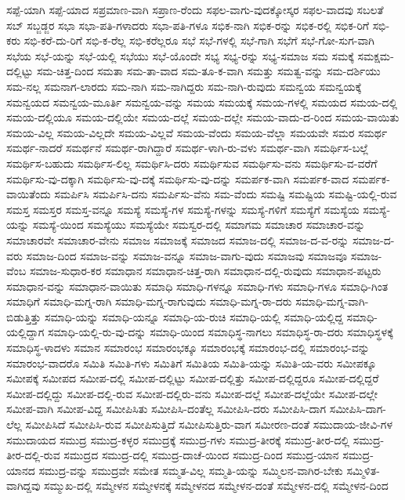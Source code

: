 {ಸಪ್ಪೆ-ಯಾಗಿ
ಸಪ್ಪೆ-ಯಾದ
ಸಪ್ರಮಾಣ-ವಾಗಿ
ಸಪ್ರಾಣ-ರೆಂದು
ಸಫಲ-ವಾಗು-ವುದಕ್ಕೋಸ್ಕರ
ಸಫಲ-ವಾದವು
ಸಬಲತೆ
ಸಬ್
ಸಬ್ಜಡ್ಜರ
ಸಭಾ
ಸಭಾ-ಪತಿ-ಗಳಾದರು
ಸಭಾ-ಪತಿ-ಗಳೂ
ಸಭಿಕ-ನಾಗಿ
ಸಭಿಕ-ರನ್ನು
ಸಭಿಕ-ರಲ್ಲಿ
ಸಭಿಕ-ರಿಗೆ
ಸಭಿ-ಕರು
ಸಭಿ-ಕರೆ-ದು-ರಿಗೆ
ಸಭಿ-ಕ-ರೆಲ್ಲ
ಸಭಿ-ಕರೆಲ್ಲರೂ
ಸಭೆ
ಸಭೆ-ಗಳಲ್ಲಿ
ಸಭೆ-ಗಾಗಿ
ಸಭೆಗೆ
ಸಭೆ-ಗೋ-ಸುಗ-ವಾಗಿ
ಸಭೆಯ
ಸಭೆ-ಯನ್ನು
ಸಭೆ-ಯಲ್ಲಿ
ಸಭೆಯು
ಸಭೆ-ಯೊಂದೇ
ಸಭ್ಯ
ಸಭ್ಯ-ರನ್ನು
ಸಭ್ಯ-ಸಮಾಜ
ಸಮ
ಸಮಕ್ಕೆ
ಸಮಕ್ಷಮ-ದಲ್ಲಿಟ್ಟು
ಸಮ-ಚಿತ್ತ-ದಿಂದ
ಸಮತಾ
ಸಮ-ತಾ-ವಾದ
ಸಮ-ತೂ-ಕ-ವಾಗಿ
ಸಮತ್ತು
ಸಮತ್ವ-ವನ್ನು
ಸಮ-ದರ್ಶಿಯು
ಸಮ-ನಲ್ಲ
ಸಮನಾಗ-ಲಾರದು
ಸಮ-ನಾಗಿ
ಸಮ-ನಾಗಿದ್ದರು
ಸಮ-ನಾಗಿ-ರುವುದು
ಸಮನ್ವಯ
ಸಮನ್ವಯಕ್ಕೆ
ಸಮನ್ವಯದ
ಸಮನ್ವಯ-ಮೂರ್ತಿ
ಸಮನ್ವಯ-ವನ್ನು
ಸಮಯ
ಸಮಯಕ್ಕೆ
ಸಮಯ-ಗಳಲ್ಲಿ
ಸಮಯದ
ಸಮಯ-ದಲ್ಲಿ
ಸಮಯ-ದಲ್ಲಿಯೂ
ಸಮಯ-ದಲ್ಲಿಯೇ
ಸಮಯ-ದಲ್ಲೆ
ಸಮಯ-ದಲ್ಲೇ
ಸಮಯ-ವಾದು-ದ-ರಿಂದ
ಸಮಯ-ವಾಯಿತು
ಸಮಯ-ವಿಲ್ಲ
ಸಮಯ-ವಿಲ್ಲದೇ
ಸಮಯ-ವಿಲ್ಲವೆ
ಸಮಯ-ವೆಂದು
ಸಮಯ-ವೆಲ್ಲಾ
ಸಮಯವೇ
ಸಮರ
ಸಮರ್ಥ
ಸಮರ್ಥ-ನಾದರೆ
ಸಮರ್ಥನೆ
ಸಮರ್ಥ-ರಾಗಿದ್ದಾರೆ
ಸಮರ್ಥ-ಳಾಗಿ-ರು-ವಳು
ಸಮರ್ಥ-ವಾಗಿ
ಸಮರ್ಥಿಸ-ಬಲ್ಲೆ
ಸಮರ್ಥಿಸ-ಬಹುದು
ಸಮರ್ಥಿಸ-ಲಿಲ್ಲ
ಸಮರ್ಥಿಸಿ-ದರು
ಸಮರ್ಥಿಸುವ
ಸಮರ್ಥಿಸು-ವನು
ಸಮರ್ಥಿಸು-ವ-ವರೆಗೆ
ಸಮರ್ಥಿಸು-ವು-ದಕ್ಕಾಗಿ
ಸಮರ್ಥಿಸು-ವು-ದಕ್ಕೆ
ಸಮರ್ಥಿಸು-ವು-ದನ್ನು
ಸಮರ್ಪಕ-ವಾಗಿ
ಸಮರ್ಪಕ-ವಾದ
ಸಮರ್ಪಕ-ವಾಯಿತೆಂದು
ಸಮರ್ಪಿಸಿ
ಸಮರ್ಪಿಸಿ-ದನು
ಸಮರ್ಪಿಸು-ವೆನು
ಸಮ-ವೆಂದು
ಸಮಷ್ಟಿ
ಸಮಷ್ಟಿಯ
ಸಮಷ್ಟಿ-ಯಲ್ಲಿ-ರುವ
ಸಮಸ್ತ
ಸಮಸ್ತರ
ಸಮಸ್ತ-ವನ್ನೂ
ಸಮಸ್ಯೆ
ಸಮಸ್ಯೆ-ಗಳ
ಸಮಸ್ಯೆ-ಗಳನ್ನು
ಸಮಸ್ಯೆ-ಗಳಿಗೆ
ಸಮಸ್ಯೆಗೆ
ಸಮಸ್ಯೆಯ
ಸಮಸ್ಯೆ-ಯನ್ನು
ಸಮಸ್ಯೆ-ಯಿಂದ
ಸಮಸ್ಯೆಯು
ಸಮಸ್ಯೆಯೇ
ಸಮಸ್ವರ-ದಲ್ಲಿ
ಸಮಾಗಮ
ಸಮಾಚಾರ
ಸಮಾಚಾರ-ವನ್ನು
ಸಮಾಚಾರವೇ
ಸಮಾಚಾರ-ವೇನು
ಸಮಾಜ
ಸಮಾಜಕ್ಕೆ
ಸಮಾಜದ
ಸಮಾಜ-ದಲ್ಲಿ
ಸಮಾಜ-ದ-ವ-ರನ್ನು
ಸಮಾಜ-ದ-ವರು
ಸಮಾಜ-ದಿಂದ
ಸಮಾಜ-ವನ್ನು
ಸಮಾಜ-ವನ್ನೂ
ಸಮಾಜ-ವಾಗು-ವುದು
ಸಮಾಜವು
ಸಮಾಜವೂ
ಸಮಾಜ-ವೆಂಬ
ಸಮಾಜ-ಸುಧಾರ-ಕರ
ಸಮಾಧಾನ
ಸಮಾಧಾನ-ಚಿತ್ತ-ರಾಗಿ
ಸಮಾಧಾನ-ದಲ್ಲಿ-ರುವುದು
ಸಮಾಧಾನ-ಪಟ್ಟರು
ಸಮಾಧಾನ-ವನ್ನು
ಸಮಾಧಾನ-ವಾಯಿತು
ಸಮಾಧಿ
ಸಮಾಧಿ-ಗಳನ್ನೂ
ಸಮಾಧಿ-ಗಳು
ಸಮಾಧಿ-ಗಳೂ
ಸಮಾಧಿ-ಗಿಂತ
ಸಮಾಧಿಗೆ
ಸಮಾಧಿ-ಮಗ್ನ-ರಾಗಿ
ಸಮಾಧಿ-ಮಗ್ನ-ರಾಗುವುದು
ಸಮಾಧಿ-ಮಗ್ನ-ರಾ-ದರು
ಸಮಾಧಿ-ಮಗ್ನ-ವಾಗಿ-ಬಿಡುತ್ತಿತ್ತು
ಸಮಾಧಿ-ಯನ್ನು
ಸಮಾಧಿ-ಯನ್ನೂ
ಸಮಾಧಿ-ಯ-ರುಚಿ
ಸಮಾಧಿ-ಯಲ್ಲಿ
ಸಮಾಧಿ-ಯಲ್ಲಿದ್ದ
ಸಮಾಧಿ-ಯಲ್ಲಿದ್ದಾಗ
ಸಮಾಧಿ-ಯಲ್ಲಿ-ರು-ವು-ದನ್ನು
ಸಮಾಧಿ-ಯಿಂದ
ಸಮಾಧಿಸ್ಥ-ನಾಗಲು
ಸಮಾಧಿಸ್ಥ-ರಾ-ದರು
ಸಮಾಧಿಸ್ಥಳಕ್ಕೆ
ಸಮಾಧಿಸ್ಥ-ಳಾದಳು
ಸಮಾನ
ಸಮಾರಂಭ
ಸಮಾರಂಭಕ್ಕೂ
ಸಮಾರಂಭಕ್ಕೆ
ಸಮಾರಂಭ-ದಲ್ಲಿ
ಸಮಾರಂಭ-ವನ್ನು
ಸಮಾರಂಭ-ವಾದರೊ
ಸಮಿತಿ
ಸಮಿತಿ-ಗಳು
ಸಮಿತಿಗೆ
ಸಮಿತಿಯ
ಸಮಿತಿ-ಯನ್ನು
ಸಮಿತಿ-ಯ-ವರು
ಸಮೀಪಕ್ಕೂ
ಸಮೀಪಕ್ಕೆ
ಸಮೀಪದ
ಸಮೀಪ-ದಲ್ಲಿ
ಸಮೀಪ-ದಲ್ಲಿಟ್ಟು
ಸಮೀಪ-ದಲ್ಲಿತ್ತು
ಸಮೀಪ-ದಲ್ಲಿದ್ದರೂ
ಸಮೀಪ-ದಲ್ಲಿದ್ದರೆ
ಸಮೀಪ-ದಲ್ಲಿದ್ದು
ಸಮೀಪ-ದಲ್ಲಿ-ರುವ
ಸಮೀಪ-ದಲ್ಲಿರು-ವನು
ಸಮೀಪ-ದಲ್ಲೆ
ಸಮೀಪ-ದಲ್ಲೆಯೇ
ಸಮೀಪ-ದಲ್ಲೇ
ಸಮೀಪ-ವಾಗಿ
ಸಮೀಪ-ವಿದ್ದ
ಸಮೀಪಿಸಿತು
ಸಮೀಪಿಸಿ-ದಂತೆಲ್ಲ
ಸಮೀಪಿಸಿ-ದರು
ಸಮೀಪಿಸಿ-ದಾಗ
ಸಮೀಪಿಸಿ-ದಾಗ-ಲೆಲ್ಲ
ಸಮೀಪಿಸಿದೆ
ಸಮೀಪಿಸಿ-ರುವ
ಸಮೀಪಿಸುತ್ತಿದೆ
ಸಮೀಪಿಸುತ್ತಿರು-ವಾಗ
ಸಮೀರಣ-ದಂತೆ
ಸಮುದಾಯ-ಜೀವಿ-ಗಳ
ಸಮುದಾಯದ
ಸಮುದ್ರ
ಸಮುದ್ರ-ಕಳ್ಳರ
ಸಮುದ್ರಕ್ಕೆ
ಸಮುದ್ರ-ಗಳು
ಸಮುದ್ರ-ತೀರಕ್ಕೆ
ಸಮುದ್ರ-ತೀರ-ದಲ್ಲಿ
ಸಮುದ್ರ-ತೀರ-ದಲ್ಲಿ-ರುವ
ಸಮುದ್ರದ
ಸಮುದ್ರ-ದಲ್ಲಿ
ಸಮುದ್ರ-ದಾಚೆ-ಯಿಂದ
ಸಮುದ್ರ-ದಿಂದ
ಸಮುದ್ರ-ಯಾನ
ಸಮುದ್ರ-ಯಾನದ
ಸಮುದ್ರ-ವನ್ನು
ಸಮುದ್ರವೇ
ಸಮೇತ
ಸಮ್ಮತ-ವಿಲ್ಲ
ಸಮ್ಮತಿ-ಯನ್ನು
ಸಮ್ಮಿಲನ-ವಾಗಿರ-ಬೇಕು
ಸಮ್ಮಿಳಿತ-ವಾಗಿದ್ದವು
ಸಮ್ಮುಖ-ದಲ್ಲಿ
ಸಮ್ಮೇಳನ
ಸಮ್ಮೇಳನಕ್ಕೆ
ಸಮ್ಮೇಳನದ
ಸಮ್ಮೇಳನ-ದಂತೆ
ಸಮ್ಮೇಳನ-ದಲ್ಲಿ
ಸಮ್ಮೇಳನ-ದಿಂದ
}

